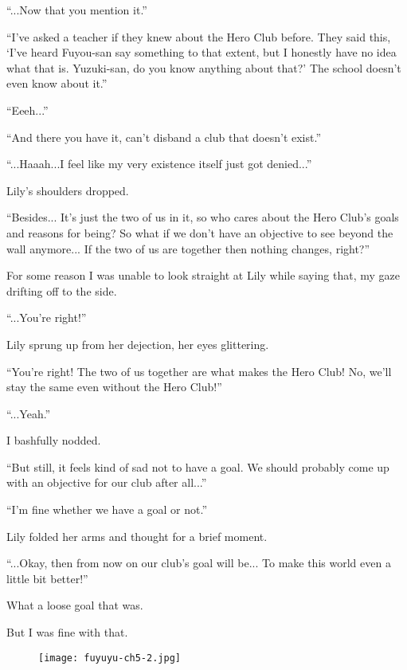 ``...Now that you mention it.''

``I've asked a teacher if they knew about the Hero Club before. They said this, `I've heard Fuyou-san say something to that extent, but I honestly have no idea what that is. Yuzuki-san, do you know anything about that?' The school doesn't even know about it.''

``Eeeh...''

``And there you have it, can't disband a club that doesn't exist.''

``...Haaah...I feel like my very existence itself just got denied...''

Lily's shoulders dropped.

``Besides... It's just the two of us in it, so who cares about the Hero Club's goals and reasons for being? So what if we don't have an objective to see beyond the wall anymore... If the two of us are together then nothing changes, right?''

For some reason I was unable to look straight at Lily while saying that, my gaze drifting off to the side.

``...You're right!''

Lily sprung up from her dejection, her eyes glittering.

``You're right! The two of us together are what makes the Hero Club! No, we'll stay the same even without the Hero Club!''

``...Yeah.''

I bashfully nodded.

``But still, it feels kind of sad not to have a goal. We should probably come up with an objective for our club after all...''

``I'm fine whether we have a goal or not.''

Lily folded her arms and thought for a brief moment.

``...Okay, then from now on our club's goal will be... To make this world even a little bit better!''

What a loose goal that was.

But I was fine with that.

\begin{figure}[p]
\texttt{[image: fuyuyu-ch5-2.jpg]}
\end{figure}

